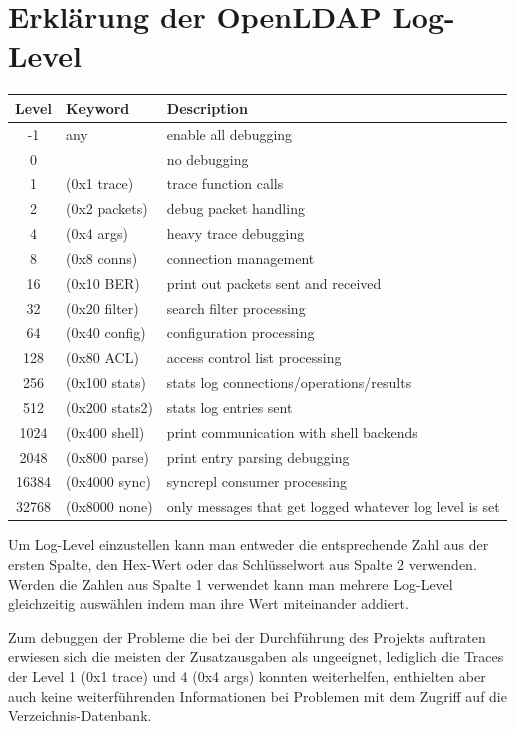 \documentclass[11pt,a4paper,titlepage=firstiscover,headsepline,bibtotoc]{scrartcl} %
\begin{document}
\section{Erklärung der OpenLDAP Log-Level} \label{sec:LDAP-Loglevel}
\begin{tabularx}{\textwidth}{|c|l|X|}
\hline
Level &	Keyword &	Description\\
\hline
-1 &	any &	enable all debugging\\
\hline
0 &	  &	no debugging\\
\hline
1 &	(0x1 trace) &	trace function calls\\
\hline
2 &	(0x2 packets) &	debug packet handling\\
\hline
4 &	(0x4 args) &	heavy trace debugging\\
\hline
8 &	(0x8 conns)& 	connection management\\
\hline
16 &	(0x10 BER) & 	print out packets sent and received\\
\hline
32 &	(0x20 filter) &	search filter processing\\
\hline
64 &	(0x40 config) &	configuration processing\\
\hline
128 &	(0x80 ACL) &	access control list processing\\
\hline
256 &	(0x100 stats) &	stats log connections/operations/results\\
\hline
512 &	(0x200 stats2) &	stats log entries sent\\
\hline
1024 &	(0x400 shell) &	print communication with shell backends\\
\hline
2048 &	(0x800 parse) &	print entry parsing debugging\\
\hline
16384 &	(0x4000 sync) &	syncrepl consumer processing\\
\hline
32768 &	(0x8000 none) &	only messages that get logged whatever log level is set \\
\hline
\end{tabularx}

\bigskip
\noindent Um Log-Level einzustellen kann man entweder die entsprechende Zahl aus der ersten Spalte, den Hex-Wert oder das Schlüsselwort aus Spalte 2 verwenden. Werden die Zahlen aus Spalte 1 verwendet kann man mehrere Log-Level gleichzeitig auswählen indem man ihre Wert miteinander addiert.

Zum debuggen der Probleme die bei der Durchführung des Projekts auftraten erwiesen sich die meisten der Zusatzausgaben als ungeeignet, lediglich die Traces der Level 1 (0x1 trace) und 4 (0x4 args) konnten weiterhelfen, enthielten aber auch keine weiterführenden Informationen bei Problemen mit dem Zugriff auf die Verzeichnis-Datenbank.
\end{document}

